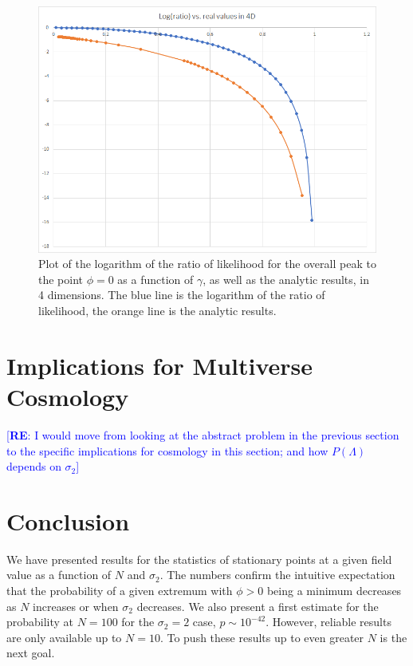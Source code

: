\documentclass[12pt]{article}
\newcommand{\re}[1]{\textcolor{blue}{[{\bf RE}: #1]}}
\begin{document}
\begin{figure}
  \centering
  \includegraphics[width=\linewidth]{LogRatioNoFit.png}
  \caption{Plot of the logarithm of the ratio of likelihood for the overall peak to the point $\phi = 0$ as a function of $\gamma$, as well as the analytic results, in 4 dimensions. The blue line is the logarithm of the ratio of likelihood, the orange line is the analytic results.}
  \label{LogRatioNoFit}
\end{figure}

\section{Implications for Multiverse Cosmology}

\re{I would move from looking at the abstract problem in the previous section to the specific implications for cosmology in this section; and how $P(\Lambda)$ depends on $\sigma_2$}

\section{Conclusion}
We have presented results for the statistics of stationary points at a given field value as a function of $N$ and $\sigma_2$. The numbers confirm the intuitive expectation that the probability of a given extremum with $\phi > 0$ being a minimum decreases as $N$ increases or when $\sigma_2$ decreases. We also present a first estimate for the probability at $N=100$ for the $\sigma_2=2$ case, $p \sim 10^{-42}$. However, reliable results are only available up to $N=10$. To push these results up to even greater $N$ is the next goal.
\end{document}

